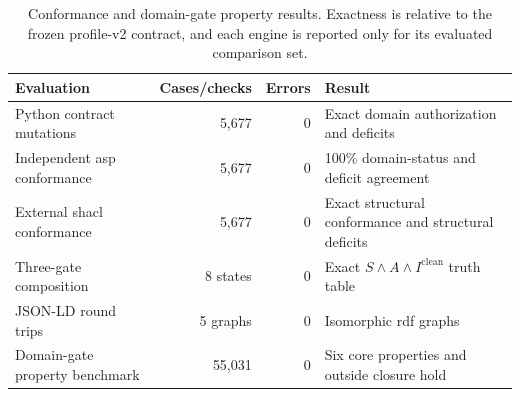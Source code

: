 \begin{table}[!htbp]
\centering
\caption{Conformance and domain-gate property results. Exactness is relative to the frozen profile-v2 contract, and each engine is reported only for its evaluated comparison set.}
\label{tab:standards-formal-results}
\footnotesize
\renewcommand{\arraystretch}{1.08}
\begin{tabularx}{\textwidth}{@{}p{}r r Y@{}}
\toprule
Evaluation & Cases/checks & Errors & Result \\
\midrule
Python contract mutations & 5,677 & 0 & Exact domain authorization and deficits \\
Independent \ac{asp} conformance & 5,677 & 0 & 100\% domain-status and deficit agreement \\
External \ac{shacl} conformance & 5,677 & 0 & Exact structural conformance and structural deficits \\
Three-gate composition & 8 states & 0 & Exact $S\land A\land I^{\mathrm{clean}}$ truth table \\
JSON-LD round trips & 5 graphs & 0 & Isomorphic \ac{rdf} graphs \\
Domain-gate property benchmark & 55,031 & 0 & Six core properties and outside closure hold \\
\bottomrule
\end{tabularx}
\end{table}
